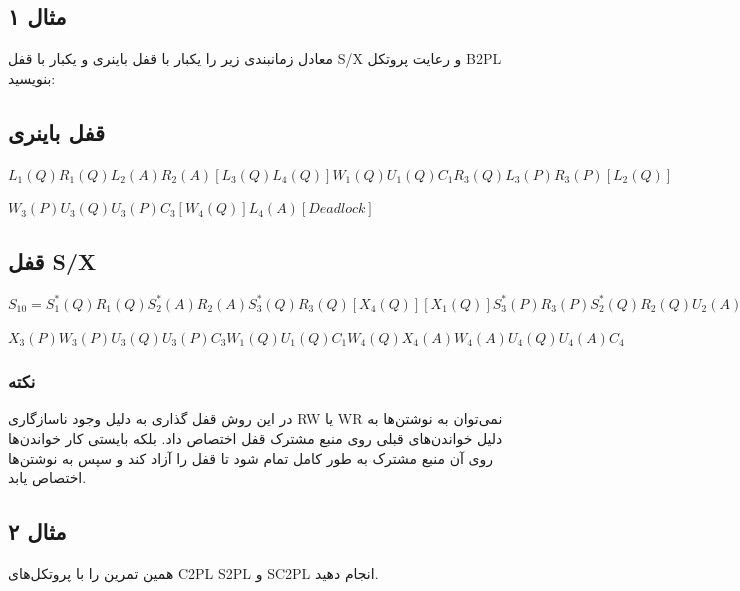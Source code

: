 \documentclass[a4paper]{article}
\begin{document}
\subsection*{مثال ۱}

معادل زمانبندی زیر را یکبار با قفل باینری و یکبار با قفل S/X و رعایت پروتکل B2PL
بنویسید:

\begin{LTR}
    \begin{table}[h]
        \begin{RTL}
            \caption{زمانبندی $S_{10}$}
        \end{RTL}
        \centering
    \end{table}
\end{LTR}

\subsection*{قفل باینری}

\begin{LTR}
\centering
$L_1(Q)R_1(Q)L_2(A)R_2(A)[L_3(Q)L_4(Q)]W_1(Q)U_1(Q)C_1R_3(Q)L_3(P)R_3(P)[L_2(Q)]$

$W_3(P)U_3(Q)U_3(P)C_3[W_4(Q)]L_4(A)[Deadlock]$
\end{LTR}

\subsection*{قفل S/X}

\begin{LTR}
\centering
$S_10 = S_1^*(Q)R_1(Q) S_2^*(A)R_2(A) S_3^*(Q)R_3(Q) [X_4(Q)][X_1(Q)]S_3^*(P)R_3(P) S_2^*(Q)R_2(Q) U_2(A)U_2(Q)C2$

$X_3(P)W_3(P) U_3(Q)U_3(P)C_3W_1(Q)U_1(Q)C_1W_4(Q)X_4(A)W_4(A)U_4(Q)U_4(A)C_4$
\end{LTR}

\subsubsection*{نکته}

در این روش قفل گذاری به دلیل وجود ناسازگاری RW یا WR نمی‌توان به نوشتن‌ها به
دلیل خواندن‌های قبلی روی منبع مشترک قفل اختصاص داد. بلکه بایستی کار خواندن‌ها
روی آن منبع مشترک به طور کامل تمام شود تا قفل را آزاد کند و سپس به نوشتن‌ها
اختصاص یابد.

\subsection*{مثال ۲}

همین تمرین را با پروتکل‌های C2PL S2PL و SC2PL انجام دهید.

\newpage
\end{document}
